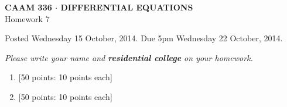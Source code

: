 \documentclass[10pt]{article}
\begin{document}
\vspace*{-5em}
\begin{center}
\large \textsf{\textbf{CAAM 336 $\cdot$ DIFFERENTIAL EQUATIONS}\\[0.5em]
Homework 7 }
\end{center}

Posted Wednesday 15 October, 2014.  Due 5pm Wednesday 22 October, 2014.
\begin{center}
\emph{Please write your name and \textbf{residential college} on your homework.}
\end{center}

\begin{enumerate}
\item {[50 points: 10 points each]}\\  
\newpage
\item {[50 points: 10 points each]}\\  
\newpage


\end{enumerate}
\end{document}
